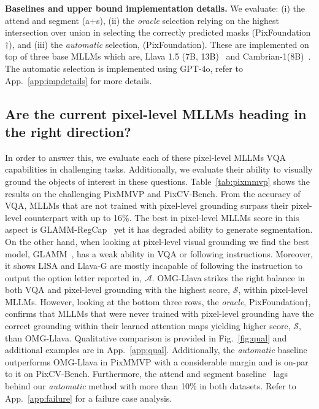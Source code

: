 \textbf{Baselines and upper bound implementation details.} We evaluate: (i) the attend and segment (a+s), (ii) the \textit{oracle} selection relying on the highest intersection over union in selecting the correctly predicted masks (PixFoundation$\dagger$), and (iii) the \textit{automatic} selection, (PixFoundation). These are implemented on top of three base MLLMs which are, Llava 1.5 (7B, 13B)~\cite{liu2024improved} and Cambrian-1(8B)~\cite{tong2024cambrian}. The automatic selection is implemented using GPT-4o, refer to App.~\ref{app:impdetails} for more details.

\subsection{Are the current pixel-level MLLMs heading in the right direction?}
In order to answer this, we evaluate each of these pixel-level MLLMs VQA capabilities in challenging tasks. Additionally, we evaluate their ability to visually ground the objects of interest in these questions. Table~\ref{tab:pixmmvp} shows the results on the challenging PixMMVP and PixCV-Bench. From the accuracy of VQA, MLLMs that are not trained with pixel-level grounding surpass their pixel-level counterpart with up to 16\%. The best in pixel-level MLLMs score in this aspect is GLAMM-RegCap~\cite{zhang2024omg} yet it has degraded ability to generate segmentation. On the other hand, when looking at pixel-level visual grounding we find the best model, GLAMM~\cite{rasheed2024glamm}, has a weak ability in VQA or following instructions. Moreover, it shows LISA and Llava-G are mostly incapable of following the instruction to output the option letter reported in, $\mathcal{A}$. OMG-Llava strikes the right balance in both VQA and pixel-level grounding with the highest score, $\mathcal{S}$, within pixel-level MLLMs. However, looking at the bottom three rows, the \textit{oracle}, PixFoundation$\dagger$, confirms that MLLMs that were never trained with pixel-level grounding have the correct grounding within their learned attention maps yielding higher score, $\mathcal{S}$, than OMG-Llava. Qualitative comparison is provided in Fig.~\ref{fig:qual} and additional examples are in App.~\ref{app:qual}. Additionally, the \textit{automatic} baseline outperforms OMG-Llava in PixMMVP with a considerable margin and is on-par to it on PixCV-Bench. Furthermore, the attend and segment baseline~\cite{cao2024emerging} lags behind our \textit{automatic} method with more than 10\% in both datasets. Refer to App.~\ref{app:failure} for a failure case analysis.

